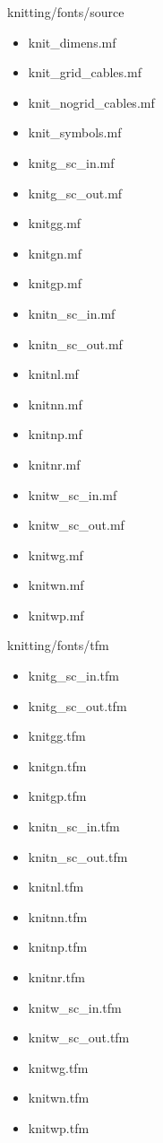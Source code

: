 \documentclass[draft]{amsart}
\begin{document}
\noindent knitting/fonts/source
\begin{itemize}
    \item knit_dimens.mf
    \item knit_grid_cables.mf
    \item knit_nogrid_cables.mf
    \item knit_symbols.mf
    \item knitg_sc_in.mf
    \item knitg_sc_out.mf
    \item knitgg.mf
    \item knitgn.mf
    \item knitgp.mf
    \item knitn_sc_in.mf
    \item knitn_sc_out.mf
    \item knitnl.mf
    \item knitnn.mf
    \item knitnp.mf
    \item knitnr.mf
    \item knitw_sc_in.mf
    \item knitw_sc_out.mf
    \item knitwg.mf
    \item knitwn.mf
    \item knitwp.mf
\end{itemize}

\noindent knitting/fonts/tfm
\begin{itemize}
    \item knitg_sc_in.tfm
    \item knitg_sc_out.tfm
    \item knitgg.tfm
    \item knitgn.tfm
    \item knitgp.tfm
    \item knitn_sc_in.tfm
    \item knitn_sc_out.tfm
    \item knitnl.tfm
    \item knitnn.tfm
    \item knitnp.tfm
    \item knitnr.tfm
    \item knitw_sc_in.tfm
    \item knitw_sc_out.tfm
    \item knitwg.tfm
    \item knitwn.tfm
    \item knitwp.tfm
\end{itemize}
\end{document}
